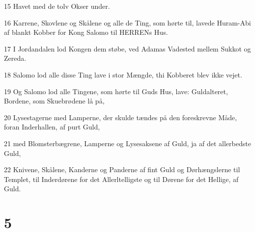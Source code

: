 \par 15 Havet med de tolv Okser under.
\par 16 Karrene, Skovlene og Skålene og alle de Ting, som hørte til, lavede Huram-Abi af blankt Kobber for Kong Salomo til HERRENs Hus.
\par 17 I Jordandalen lod Kongen dem støbe, ved Adamas Vadested mellem Sukkot og Zereda.
\par 18 Salomo lod alle disse Ting lave i stor Mængde, thi Kobberet blev ikke vejet.
\par 19 Og Salomo lod alle Tingene, som hørte til Guds Hus, lave: Guldalteret, Bordene, som Skuebrødene lå på,
\par 20 Lysestagerne med Lamperne, der skulde tændes på den foreskrevne Måde, foran Inderhallen, af purt Guld,
\par 21 med Blomsterbægrene, Lamperne og Lysesaksene af Guld, ja af det allerbedste Guld,
\par 22 Knivene, Skålene, Kanderne og Panderne af fint Guld og Dørhængslerne til Templet, til Inderdørene for det Allerltelligste og til Dørene for det Hellige, af Guld.

\chapter{5}

